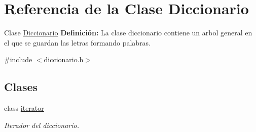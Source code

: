 \hypertarget{class_diccionario}{}\section{Referencia de la Clase Diccionario}
\label{class_diccionario}


Clase \hyperlink{class_diccionario}{Diccionario} {\bfseries Definición\+:} La clase diccionario contiene un arbol general en el que se guardan las letras formando palabras.  




{\ttfamily \#include $<$diccionario.\+h$>$}

\subsection*{Clases}
\begin{DoxyCompactItemize}
\item 
class \hyperlink{class_diccionario_1_1iterator}{iterator}
\begin{DoxyCompactList}\small\item\em Iterador del diccionario. \end{DoxyCompactList}\end{DoxyCompactItemize}
